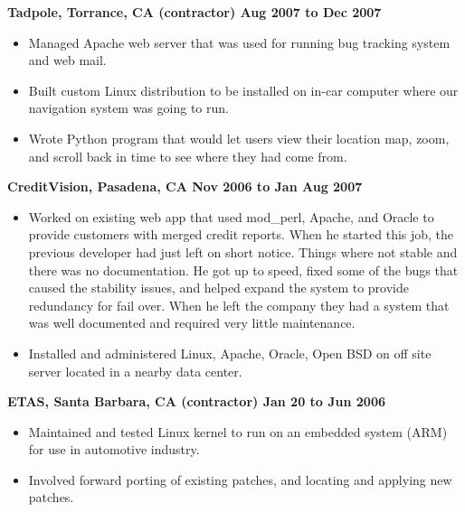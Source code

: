 \documentclass{res}
\begin{document}
\begin{resume}
{\large \bf Tadpole, Torrance, CA (contractor) \hfill Aug 2007 to Dec 2007}
\begin{itemize}

\item Managed Apache web server that was used for running bug
tracking system and web mail.

\item Built custom Linux distribution to be installed on in-car
computer where our navigation system was going to run.

\item Wrote Python program that would let users view their location
map, zoom, and scroll back in time to see where they had come from.


\end{itemize}

{\large \bf CreditVision, Pasadena, CA \hfill Nov 2006 to Jan Aug 2007}
\begin{itemize}
\item
Worked on existing web app that used mod\_perl, Apache, and Oracle to
provide customers with merged credit reports.  When he started this
job, the previous developer had just left on short notice.  Things where
not stable and there was no documentation.  He got up to speed, fixed some
of the bugs that caused the stability issues, and helped expand the system
to provide redundancy for fail over.  When he left the company they had
a system that was well documented and required very little maintenance.

\item
Installed and administered Linux, Apache, Oracle, Open BSD on off
site server located in a nearby data center.

\end{itemize}

{\large \bf ETAS, Santa Barbara, CA (contractor) \hfill Jan 20 to Jun 2006}
\begin{itemize}
\item Maintained and tested Linux kernel to run on an embedded
system (ARM) for use in automotive industry.
\item Involved forward porting of existing patches, and locating and applying
new patches.
\end{itemize}



\end{resume}
\end{document}

